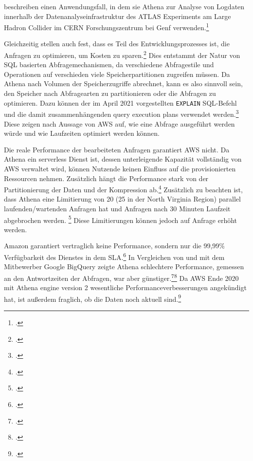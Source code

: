 \citeauthor{Hartland.2018} beschreiben einen Anwendungsfall, in dem sie Athena zur Analyse von Logdaten innerhalb der Datenanalyseinfrastruktur des ATLAS Experiments am Large Hadron Collider im CERN Forschungszentrum bei Genf verwenden.\footcite[Vgl.][]{Hartland.2018}

Gleichzeitig stellen \citeauthor{Hartland.2018} auch fest, dass es Teil des Entwicklungsprozesses ist, die Anfragen zu  optimieren, um Kosten zu sparen.\footcite[Vgl.][5]{Hartland.2018} Dies entstammt der Natur von \ac{SQL} basierten Abfragemechanismen, da verschiedene Abfragestile und Operationen auf verschieden viele Speicherpartitionen zugreifen müssen. Da Athena nach Volumen der Speicherzugriffe abrechnet, kann es also sinnvoll sein, den Speicher nach Abfragearten zu partitionieren oder die Abfragen zu optimieren. Dazu können der im April 2021 vorgestellten \texttt{EXPLAIN} \ac{SQL}-Befehl und die damit zusammenhängenden query execution plans verwendet werden.\footcite[Vgl. auch im Folgenden][]{AmazonWebServicesInc..2021} Diese zeigen nach Aussage von \ac{AWS} auf, wie eine Abfrage ausgeführt werden würde und wie Laufzeiten optimiert werden können.

Die reale Performance der bearbeiteten Anfragen garantiert \ac{AWS} nicht. Da Athena ein serverless Dienst ist, dessen unterleigende Kapazität vollständig von \ac{AWS} verwaltet wird, können Nutzende keinen Einfluss auf die provisionierten Ressourcen nehmen. Zusätzlich hängt die Performance stark von der Partitionierung der Daten und der Kompression ab.\footcite[Vgl.][]{Levy.2021} Zusätzlich zu beachten ist, dass Athena eine Limitierung von 20 (25 in der North Virginia Region) parallel laufenden/wartenden Anfragen hat und Anfragen nach 30 Minuten Laufzeit abgebrochen werden. \footcite[Vgl. auch im Folgenden][]{AmazonWebServicesInc..o.J.ac} Diese Limitierungen können jedoch auf Anfrage erhöht werden.

Amazon garantiert vertraglich keine Performance, sondern nur die 99,99\% Verfügbarkeit des Dienstes in dem \ac{SLA}.\footcite[Vgl.][]{AmazonWebServicesInc..2019c} In Vergleichen von \citeauthor{Levy.2019} und \citeauthor{Khadtare.2018} mit dem Mitbewerber Google BigQuery zeigte Athena schlechtere Performance, gemessen an den Antwortzeiten der Abfragen, war aber günstiger.\footcite[Vgl.][]{Levy.2019}\nzitat\footcite[Vgl.][]{Khadtare.2018} Da \ac{AWS} Ende 2020 mit Athena engine version 2 wesentliche Performanceverbesserungen angekündigt hat, ist außerdem fraglich, ob die Daten noch aktuell sind.\footcite[Vgl.][]{AmazonWebServicesInc..2020c}

